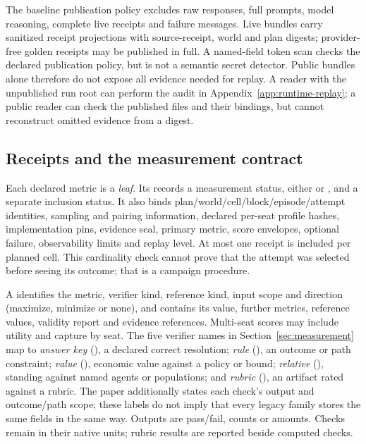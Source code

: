 The baseline publication policy excludes raw responses, full prompts,
model reasoning, complete live receipts and failure messages. Live
bundles carry sanitized receipt projections with source-receipt, world
and plan digests; provider-free golden receipts may be published in
full. A named-field token scan checks the declared publication policy,
but is not a semantic secret detector. Public bundles alone therefore
do not expose all evidence needed for replay. A reader with the
unpublished run root can perform the audit in
Appendix~\ref{app:runtime-replay}; a public reader can check the published
files and their bindings, but cannot reconstruct omitted evidence from
a digest.

\subsection{Receipts and the measurement contract}
\label{app:runtime-receipts}

Each declared metric is a \emph{leaf}. Its 
records a measurement status, either  or
, and a separate inclusion status. It also
binds plan/world/cell/block/episode/attempt identities,
sampling and pairing information, declared per-seat profile hashes,
implementation pins, evidence seal, primary metric, score envelopes,
optional failure, observability limits and replay level. At most one
receipt is included per planned cell. This cardinality check cannot
prove that the attempt was selected before seeing its outcome; that is
a campaign procedure.

A  identifies the metric, verifier kind, reference
kind, input scope and direction (maximize, minimize or none), and
contains its value, further metrics, reference values, validity report
and evidence references. Multi-seat scores may include utility and
capture by seat. The five verifier names in Section~\ref{sec:measurement} map to
\emph{answer key} (), a declared correct
resolution; \emph{rule} (), an outcome or path
constraint; \emph{value} (), economic value
against a policy or bound; \emph{relative} (), standing
against named agents or populations; and \emph{rubric}
(), an artifact rated against a rubric. The paper additionally states
each check's output and outcome/path scope; these labels do not imply
that every legacy family stores the same fields in the same way.
Outputs are pass/fail, counts or amounts. Checks remain in their native
units; rubric results are reported beside computed checks.

